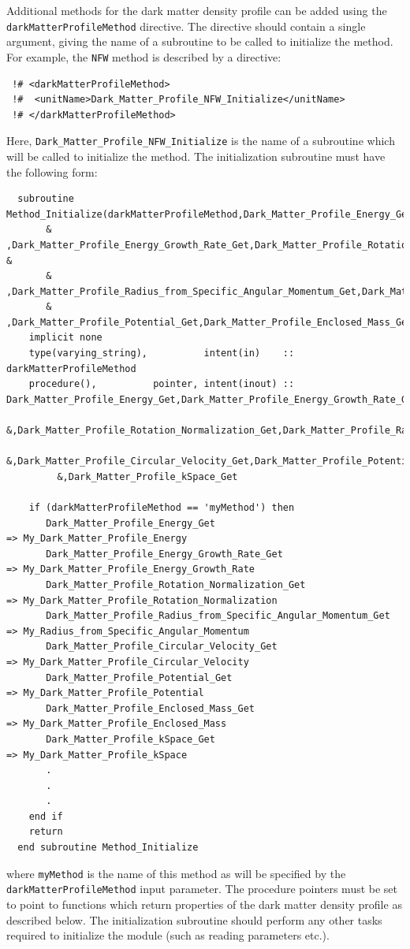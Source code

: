 Additional methods for the dark matter density profile can be added using the {\tt darkMatterProfileMethod} directive. The directive should contain a single argument, giving the name of a subroutine to be called to initialize the method. For example, the {\tt NFW} method is described by a directive:
\begin{verbatim}
 !# <darkMatterProfileMethod>
 !#  <unitName>Dark_Matter_Profile_NFW_Initialize</unitName>
 !# </darkMatterProfileMethod>
\end{verbatim}
Here, {\tt Dark\_Matter\_Profile\_NFW\_Initialize} is the name of a subroutine which will be called to initialize the method. The initialization subroutine must have the following form:
\begin{verbatim}
  subroutine Method_Initialize(darkMatterProfileMethod,Dark_Matter_Profile_Energy_Get&
       & ,Dark_Matter_Profile_Energy_Growth_Rate_Get,Dark_Matter_Profile_Rotation_Normalization_Get &
       & ,Dark_Matter_Profile_Radius_from_Specific_Angular_Momentum_Get,Dark_Matter_Profile_Circular_Velocity_Get&
       & ,Dark_Matter_Profile_Potential_Get,Dark_Matter_Profile_Enclosed_Mass_Get,Dark_Matter_Profile_kSpace_Get)
    implicit none
    type(varying_string),          intent(in)    :: darkMatterProfileMethod
    procedure(),          pointer, intent(inout) :: Dark_Matter_Profile_Energy_Get,Dark_Matter_Profile_Energy_Growth_Rate_Get&
         &,Dark_Matter_Profile_Rotation_Normalization_Get,Dark_Matter_Profile_Radius_from_Specific_Angular_Momentum_Get&
         &,Dark_Matter_Profile_Circular_Velocity_Get,Dark_Matter_Profile_Potential_Get,Dark_Matter_Profile_Enclosed_Mass_Get&
         &,Dark_Matter_Profile_kSpace_Get
    
    if (darkMatterProfileMethod == 'myMethod') then
       Dark_Matter_Profile_Energy_Get                                => My_Dark_Matter_Profile_Energy
       Dark_Matter_Profile_Energy_Growth_Rate_Get                    => My_Dark_Matter_Profile_Energy_Growth_Rate
       Dark_Matter_Profile_Rotation_Normalization_Get                => My_Dark_Matter_Profile_Rotation_Normalization
       Dark_Matter_Profile_Radius_from_Specific_Angular_Momentum_Get => My_Radius_from_Specific_Angular_Momentum
       Dark_Matter_Profile_Circular_Velocity_Get                     => My_Dark_Matter_Profile_Circular_Velocity
       Dark_Matter_Profile_Potential_Get                             => My_Dark_Matter_Profile_Potential
       Dark_Matter_Profile_Enclosed_Mass_Get                         => My_Dark_Matter_Profile_Enclosed_Mass
       Dark_Matter_Profile_kSpace_Get                                => My_Dark_Matter_Profile_kSpace
       .
       .
       .
    end if
    return
  end subroutine Method_Initialize
\end{verbatim}
where {\tt myMethod} is the name of this method as will be specified by the {\tt darkMatterProfileMethod} input parameter. The procedure pointers must be set to point to functions which return properties of the dark matter density profile as described below. The initialization subroutine should perform any other tasks required to initialize the module (such as reading parameters etc.).

